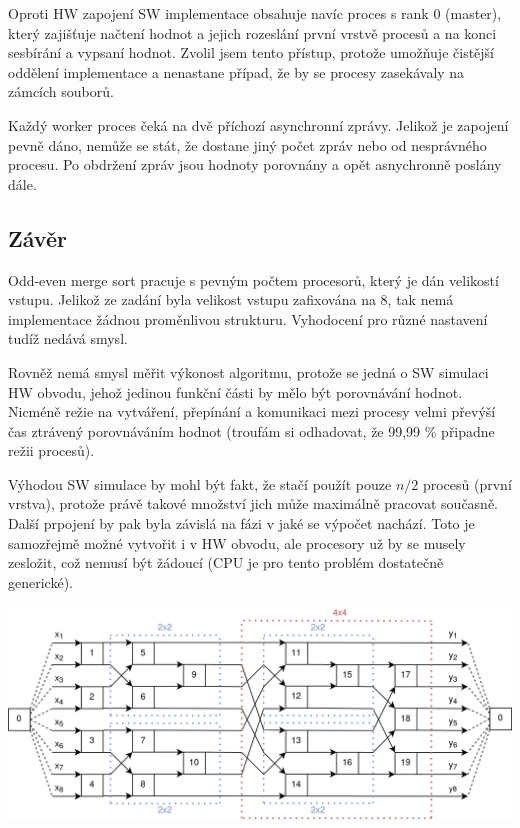 \documentclass[12pt]{article}
\begin{document}
Oproti HW zapojení SW implementace obsahuje navíc proces s rank 0 (master), který zajišťuje načtení hodnot a jejich rozeslání první vrstvě procesů a na konci sesbírání a vypsaní hodnot. Zvolil jsem tento přístup, protože umožňuje čistější oddělení implementace a nenastane případ, že by se procesy zasekávaly na zámcích souborů.

Každý worker proces čeká na dvě příchozí asynchronní zprávy. Jelikož je zapojení pevně dáno, nemůže se stát, že dostane jiný počet zpráv nebo od nesprávného procesu. Po obdržení zpráv jsou hodnoty porovnány a opět asnychronně poslány dále.

\subsection{Závěr}
Odd-even merge sort pracuje s pevným počtem procesorů, který je dán velikostí vstupu. Jelikož ze zadání byla velikost vstupu zafixována na 8, tak nemá implementace žádnou proměnlivou strukturu. Vyhodocení pro různé nastavení tudíž nedává smysl. 

Rovněž nemá smysl měřit výkonost algoritmu, protože se jedná o SW simulaci HW obvodu, jehož jedinou funkční části by mělo být porovnávání hodnot. Nicméně režie na vytváření, přepínání a komunikaci mezi procesy velmi převýší čas ztrávený porovnáváním hodnot (troufám si odhadovat, že 99,99 \% připadne režii procesů). 

Výhodou SW simulace by mohl být fakt, že stačí použít pouze \(n/2\) procesů (první vrstva), protože právě takové množství jich může maximálně pracovat současně. Další prpojení by pak byla závislá na fázi v jaké se výpočet nachází. Toto je samozřejmě možné vytvořit i v HW obvodu, ale procesory už by se musely zesložit, což nemusí být žádoucí (CPU je pro tento problém dostatečně generické).

\hspace{-2cm}
\includegraphics[width=0.9\paperwidth]{4x4-diagram.png}
\label{diagram}
\end{document}
